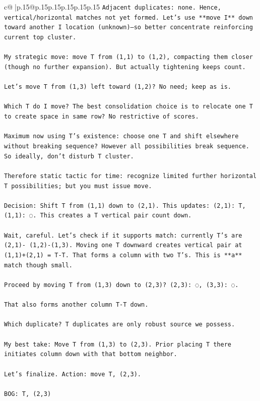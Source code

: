 \documentclass{article}
\begin{document}
{\begin{supertabular}{c@{$\;$}|p{.15\linewidth}@{}p{.15\linewidth}p{.15\linewidth}p{.15\linewidth}p{.15\linewidth}p{.15\linewidth}}
{{{\texttt{Adjacent duplicates: none. Hence, vertical/horizontal matches not yet formed. Let's use **move I** down toward another I location (unknown)—so better concentrate reinforcing current top cluster.} \\
\\ 
\texttt{My strategic move: move T from (1,1) to (1,2), compacting them closer (though no further expansion). But actually tightening keeps count.} \\
\\ 
\texttt{Let's move T from (1,3) left toward (1,2)? No need; keep as is.} \\
\\ 
\texttt{Which T do I move? The best consolidation choice is to relocate one T to create space in same row? No restrictive of scores.} \\
\\ 
\texttt{Maximum now using T's existence: choose one T and shift elsewhere without breaking sequence? However all possibilities break sequence. So ideally, don't disturb T cluster.} \\
\\ 
\texttt{Therefore static tactic for time: recognize limited further horizontal T possibilities; but you must issue move.} \\
\\ 
\texttt{Decision: Shift T from (1,1) down to (2,1). This updates: (2,1): T, (1,1): ◌. This creates a T vertical pair count down.} \\
\\ 
\texttt{Wait, careful. Let's check if it supports match: currently T's are (2,1){-} (1,2){-}(1,3). Moving one T downward creates vertical pair at (1,1)+(2,1) = T{-}T. That forms a column with two T's. This is **a** match though small.} \\
\\ 
\texttt{Proceed by moving T from (1,3) down to (2,3)?  (2,3): ◌, (3,3): ◌.} \\
\\ 
\texttt{That also forms another column T{-}T down.} \\
\\ 
\texttt{Which duplicate? T duplicates are only robust source we possess.} \\
\\ 
\texttt{My best take: Move T from (1,3) to (2,3). Prior placing T there initiates column down with that bottom neighbor.} \\
\\ 
\texttt{Let's finalize. Action: move T, (2,3).} \\
\\ 
\texttt{BOG: T, (2,3)} \\
            }
        }
    }
     \\ \\


\end{supertabular}}
\end{document}
